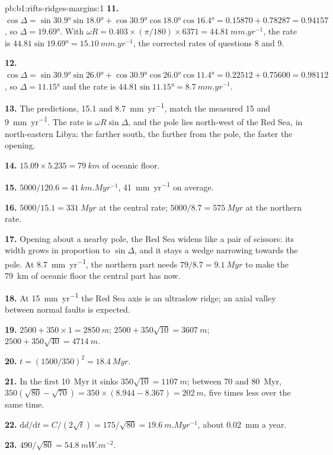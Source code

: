 \begin{solution}{pb:b1:rifts-ridges-margins:1}
\textbf{11.} $\cos\Delta = \sin\ang{30.9}\sin\ang{18.0} +
\cos\ang{30.9}\cos\ang{18.0}\cos\ang{16.4} = 0.15870 + 0.78287 = 0.94157$, so
$\Delta = \ang{19.69}$. With $\omega R = 0.403\times(\pi/180)\times6371 =
\qty{44.81}{mm.yr^{-1}}$, the rate is $44.81\sin\ang{19.69} =
\qty{15.10}{mm.yr^{-1}}$, the corrected rates of questions 8 and 9.

\textbf{12.} $\cos\Delta = \sin\ang{30.9}\sin\ang{26.0} +
\cos\ang{30.9}\cos\ang{26.0}\cos\ang{11.4} = 0.22512 + 0.75600 = 0.98112$, so
$\Delta = \ang{11.15}$ and the rate is $44.81\sin\ang{11.15} =
\qty{8.7}{mm.yr^{-1}}$.

\textbf{13.} The predictions, 15.1 and \qty{8.7}{mm.yr^{-1}}, match the
measured 15 and \qty{9}{mm.yr^{-1}}. The rate is $\omega R\sin\Delta$, and the
pole lies north-west of the Red Sea, in north-eastern Libya: the farther south, the farther
from the pole, the faster the opening.

\textbf{14.} $15.09\times5.235 = \qty{79}{km}$ of oceanic floor.

\textbf{15.} $5000/120.6 = \qty{41}{km.Myr^{-1}}$, \qty{41}{mm.yr^{-1}} on
average.

\textbf{16.} $5000/15.1 = \qty{331}{Myr}$ at the central rate;
$5000/8.7 = \qty{575}{Myr}$ at the northern rate.

\textbf{17.} Opening about a nearby pole, the Red Sea widens like a pair of
scissors: its width grows in proportion to $\sin\Delta$, and it stays a wedge
narrowing towards the pole. At \qty{8.7}{mm.yr^{-1}}, the northern part needs
$79/8.7 = \qty{9.1}{Myr}$ to make the \qty{79}{km} of oceanic floor the
central part has now.

\textbf{18.} At \qty{15}{mm.yr^{-1}} the Red Sea axis is an ultraslow ridge; an
axial valley between normal faults is expected.

\textbf{19.} $2500 + 350\times1 = \qty{2850}{m}$;
$2500 + 350\sqrt{10} = \qty{3607}{m}$; $2500 + 350\sqrt{40} = \qty{4714}{m}$.

\textbf{20.} $t = (1500/350)^2 = \qty{18.4}{Myr}$.

\textbf{21.} In the first \qty{10}{Myr} it sinks $350\sqrt{10} = \qty{1107}{m}$;
between 70 and \qty{80}{Myr}, $350(\sqrt{80} - \sqrt{70}) = 350\times(8.944 -
8.367) = \qty{202}{m}$, five times less over the same time.

\textbf{22.} $\mathrm dd/\mathrm dt = C/(2\sqrt t) = 175/\sqrt{80} =
\qty{19.6}{m.Myr^{-1}}$, about \qty{0.02}{mm} a year.

\textbf{23.} $490/\sqrt{80} = \qty{54.8}{mW.m^{-2}}$.


\end{solution}
